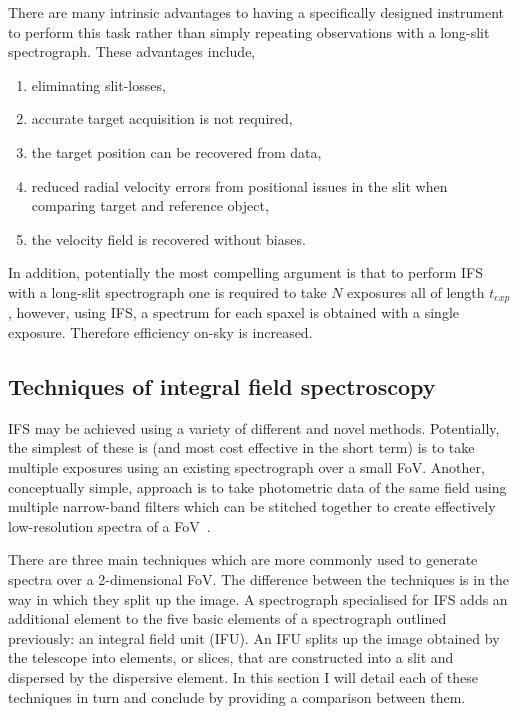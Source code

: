 There are many intrinsic advantages to having a specifically designed instrument to perform this task rather than simply repeating observations with a long-slit spectrograph.
These advantages include,

\begin{enumerate}
    \item eliminating slit-losses,
    \item accurate target acquisition is not required,
    \item the target position can be recovered from data,
    \item reduced radial velocity errors from positional issues in the slit when comparing target and reference object,
    \item the velocity field is recovered without biases.
\end{enumerate}

In addition, potentially the most compelling argument is that to perform IFS with a long-slit spectrograph one is required to take $N$ exposures all of length $t_{exp}$, however, using IFS, a spectrum for each spaxel is obtained with a single exposure. Therefore efficiency on-sky is increased.


\subsection{Techniques of integral field spectroscopy} %
\label{sub:techniques_of_integral_field_spectroscopy}

IFS may be achieved using a variety of different and novel methods.
Potentially, the simplest of these is (and most cost effective in the short term) is to take multiple exposures using an existing spectrograph over a small FoV.
Another, conceptually simple, approach is to take photometric data of the same field using multiple narrow-band filters which can be stitched together to create effectively low-resolution spectra of a FoV~\citep[e.g. GTC-OSIRIS][]{2011PASP..123.1107M}.


There are three main techniques which are more commonly used to generate spectra over a 2-dimensional FoV.
The difference between the techniques is in the way in which they split up the image.
A spectrograph specialised for IFS adds an additional element to the five basic elements of a spectrograph outlined previously: an integral field unit (IFU).
An IFU splits up the image obtained by the telescope into elements, or slices, that are constructed into a slit and dispersed by the dispersive element.
In this section I will detail each of these techniques in turn and conclude by providing a comparison between them.

